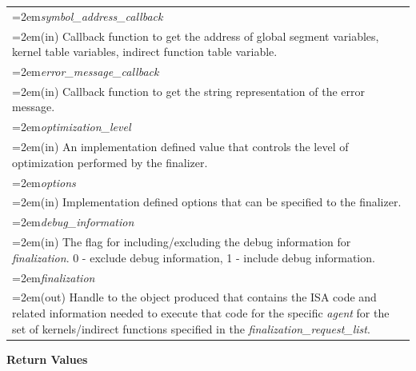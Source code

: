 \documentclass[final,oneside]{book}
\newcommand{\hsaarg}[1]{\textit{#1}}
\begin{document}
\begin{longtable}{@{}>{\hangindent=2em}p{\textwidth}}
\hsaarg{symbol_\-address_\-callback}\\\hspace{2em}(in) Callback function to get the address of global segment variables, kernel table variables, indirect function table variable.\\[2mm]
\hsaarg{error_\-message_\-callback}\\\hspace{2em}(in) Callback function to get the string representation of the error message.\\[2mm]
\hsaarg{optimization_\-level}\\\hspace{2em}(in) An implementation defined value that controls the level of optimization performed by the finalizer.\\[2mm]
\hsaarg{options}\\\hspace{2em}(in) Implementation defined options that can be specified to the finalizer.\\[2mm]
\hsaarg{debug_\-information}\\\hspace{2em}(in) The flag for including/excluding the debug information for \textit{finalization}. 0 - exclude debug information, 1 - include debug information.\\[2mm]
\hsaarg{finalization}\\\hspace{2em}(out) Handle to the object produced that contains the ISA code and related information needed to execute that code for the specific \textit{agent} for the set of kernels/indirect functions specified in the \textit{finalization_\-request_\-list}.
\end{longtable}
\vspace{-5mm}\noindent\textbf{Return Values}\\[-6mm]
\end{document}
